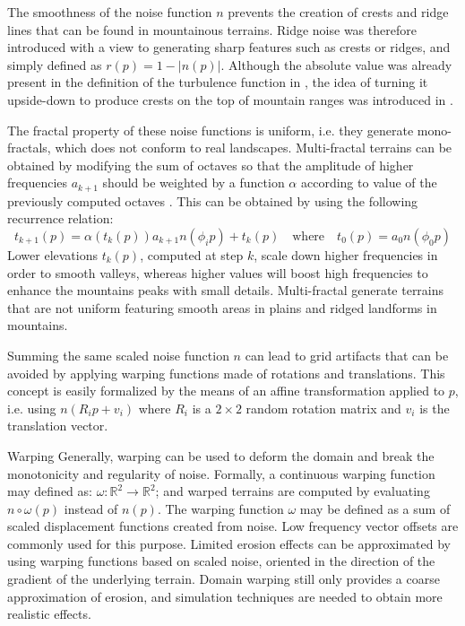 \documentclass{article}
\begin{document}
The smoothness of the noise function $n$ prevents the creation of crests and ridge lines that can be found in mountainous terrains. Ridge noise was therefore introduced with a view to generating sharp features such as crests or ridges, and simply defined as $r(p) = 1 - |n(p)|$. Although the absolute value was already present in the definition of the turbulence function in \cite{Per85}, the idea of turning it upside-down to produce crests on the top of mountain ranges was introduced in \cite{EMP98}.

The fractal property of these noise functions is uniform, i.e. they generate mono-fractals, which does not conform to real landscapes. Multi-fractal terrains can be obtained by modifying the sum of octaves so that the amplitude of higher frequencies $a_{k+1}$ should be weighted by a function $\alpha$ according to value of the previously computed octaves \cite{EMP98}. This can be obtained by using the following recurrence relation:
\[
t_{k+1}(p) = \alpha(t_k(p)) a_{k+1} n(\phi_i p) + t_k(p) \quad \text{where} \quad t_0(p) = a_0 n(\phi_0 p)
\]
Lower elevations $t_k(p)$, computed at step $k$, scale down higher frequencies in order to smooth valleys, whereas higher values will boost high frequencies to enhance the mountains peaks with small details. Multi-fractal generate terrains that are not uniform featuring smooth areas in plains and ridged landforms in mountains.

Summing the same scaled noise function $n$ can lead to grid artifacts that can be avoided by applying warping functions made of rotations and translations. This concept is easily formalized by the means of an affine transformation applied to $p$, i.e. using $n(R_i p + v_i)$ where $R_i$ is a $2 \times 2$ random rotation matrix and $v_i$ is the translation vector.

Warping Generally, warping can be used to deform the domain and break the monotonicity and regularity of noise. Formally, a continuous warping function may defined as: $\omega : \mathbb{R}^2 \to \mathbb{R}^2$; and warped terrains are computed by evaluating $n \circ \omega(p)$ instead of $n(p)$. The warping function $\omega$ may be defined as a sum of scaled displacement functions created from noise. Low frequency vector offsets are commonly used for this purpose. Limited erosion effects can be approximated \cite{dCB09} by using warping functions based on scaled noise, oriented in the direction of the gradient of the underlying terrain. Domain warping still only provides a coarse approximation of erosion, and simulation techniques are needed to obtain more realistic effects.
\end{document}
